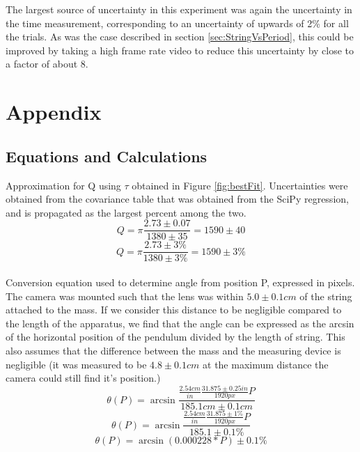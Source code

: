 \documentclass[11pt]{article}
\begin{document}
        The largest source of uncertainty in this experiment was again the uncertainty in the time measurement, corresponding to an uncertainty of upwards of 2\% for all the trials. As was the case described in section \ref{sec:StringVsPeriod}, this could be improved by taking a high frame rate video to reduce this uncertainty by close to a factor of about 8. 

    \section{Appendix}
        \subsection{Equations and Calculations}\label{app:Calc}
            Approximation for Q using $\tau$ obtained in Figure \ref{fig:bestFit}. Uncertainties were obtained from the covariance table that was obtained from the SciPy regression, and is propagated as the largest percent among the two.
            \begin{equation}
                Q = \pi\frac{2.73 \pm 0.07}{1380 \pm 35} = 1590 \pm 40
                \label{calc:tauApprox}
            \end{equation}
            \begin{equation}
                Q = \pi\frac{2.73 \pm 3\%}{1380 \pm 3\%} = 1590 \pm 3\% 
                \label{calc:tauApprox}
            \end{equation}
            \\
            Conversion equation used to determine angle from position P, expressed in pixels. The camera was mounted such that the lens was within $5.0 \pm 0.1cm$ of the string attached to the mass. If we consider this distance to be negligible compared to the length of the apparatus, we find that the angle can be expressed as the arcsin of the horizontal position of the pendulum divided by the length of string. This also assumes that the difference between the mass and the measuring device is negligible (it was measured to be $4.8 \pm 0.1cm$ at the maximum distance the camera could still find it's position.)
            \begin{equation}
                \theta(P) = \arcsin{\frac{\frac{2.54cm}{in}\frac{31.875 \pm 0.25in}{1920px} P}{185.1cm \pm 0.1cm}} 
                \label{calc:thetaApprox}
            \end{equation}
            \begin{equation}
                \theta(P) = \arcsin{\frac{\frac{2.54cm}{in}\frac{31.875 \pm 1\%}{1920px} P}{185.1 \pm 0.1\%}} 
            \end{equation}
            \begin{equation}
                \theta(P) = \arcsin{(0.000228 * P)} \pm 0.1\% 
            \end{equation}
        
\end{document}
